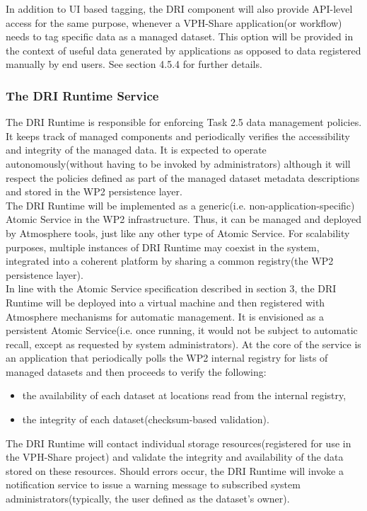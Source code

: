 \documentclass[a4paper,12pt,titlepage]{article}
\begin{document}
\noindent
In addition to UI based tagging, the DRI component will also provide API-level access for the same purpose, whenever a VPH-Share application(or workflow) needs to tag specific data as a managed dataset. This option will be provided in the context of useful data generated by applications as opposed to data registered manually by end users. See section 4.5.4 for further details.

\subsubsection{The DRI Runtime Service}
The DRI Runtime is responsible for enforcing Task 2.5 data management policies. It keeps track of managed components and periodically verifies the accessibility and integrity of the managed data. It is expected to operate autonomously(without having to be invoked by administrators) although it will respect the policies defined as part of the managed dataset metadata descriptions and stored in the WP2 persistence layer.\\

\noindent
The DRI Runtime will be implemented as a generic(i.e. non-application-specific) Atomic Service in the WP2 infrastructure. Thus, it can be managed and deployed by Atmosphere tools, just like any other type of Atomic Service. For scalability purposes, multiple instances of DRI Runtime may coexist in the system, integrated into a coherent platform by sharing a common registry(the WP2 persistence layer).\\

\noindent
In line with the Atomic Service specification described in section 3, the DRI Runtime will be deployed into a virtual machine and then registered with Atmosphere mechanisms for automatic management. It is envisioned as a persistent Atomic Service(i.e. once running, it would not be subject to automatic recall, except as requested by system administrators). At the core of the service is an application that periodically polls the WP2 internal registry for lists of managed datasets and then proceeds to verify the following:

\begin{itemize}
\item the availability of each dataset at locations read from the internal registry,
\item the integrity of each dataset(checksum-based validation).
\end{itemize}

\noindent
The DRI Runtime will contact individual storage resources(registered for use in the VPH-Share project) and validate the integrity and availability of the data stored on these resources. Should errors occur, the DRI Runtime will invoke a notification service to issue a warning message to subscribed system administrators(typically, the user defined as the dataset's owner).\\
\end{document}
